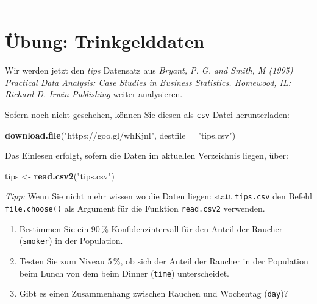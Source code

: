 \documentclass[12pt,ngerman,paper=a4,pagesize,DIV=13]{scrreprt}
\newenvironment{Shaded}{\begin{snugshade}}{\end{snugshade}}
\newcommand{\DataTypeTok}[1]{\textcolor[rgb]{0.13,0.29,0.53}{#1}}
\newcommand{\KeywordTok}[1]{\textcolor[rgb]{0.13,0.29,0.53}{\textbf{#1}}}
\newcommand{\NormalTok}[1]{#1}
\newcommand{\StringTok}[1]{\textcolor[rgb]{0.31,0.60,0.02}{#1}}
\providecommand{\tightlist}{%
  \setlength{\itemsep}{0pt}\setlength{\parskip}{0pt}}
\begin{document}
\begin{center}\rule{0.5\linewidth}{\linethickness}\end{center}

\hypertarget{ubung-trinkgelddaten}{%
\section{Übung: Trinkgelddaten}\label{ubung-trinkgelddaten}}

Wir werden jetzt den \emph{tips} Datensatz aus \emph{Bryant, P. G. and
Smith, M (1995) Practical Data Analysis: Case Studies in Business
Statistics. Homewood, IL: Richard D. Irwin Publishing} weiter
analysieren.

Sofern noch nicht geschehen, können Sie diesen als \texttt{csv} Datei
herunterladen:

\begin{Shaded}
\begin{Highlighting}[]
\KeywordTok{download.file}\NormalTok{(}\StringTok{"https://goo.gl/whKjnl"}\NormalTok{, }\DataTypeTok{destfile =} \StringTok{"tips.csv"}\NormalTok{)}
\end{Highlighting}
\end{Shaded}

Das Einlesen erfolgt, sofern die Daten im aktuellen Verzeichnis liegen,
über:

\begin{Shaded}
\begin{Highlighting}[]
\NormalTok{tips <-}\StringTok{ }\KeywordTok{read.csv2}\NormalTok{(}\StringTok{"tips.csv"}\NormalTok{)}
\end{Highlighting}
\end{Shaded}

\emph{Tipp:} Wenn Sie nicht mehr wissen wo die Daten liegen: statt
\texttt{tips.csv} den Befehl \texttt{file.choose()} als Argument für die
Funktion \texttt{read.csv2} verwenden.

\begin{enumerate}
\def\labelenumi{\arabic{enumi}.}
\tightlist
\item
  Bestimmen Sie ein 90\(\,\)\% Konfidenzintervall für den Anteil der
  Raucher (\texttt{smoker}) in der Population.
\item
  Testen Sie zum Niveau 5\(\,\)\%, ob sich der Anteil der Raucher in der
  Population beim Lunch von dem beim Dinner (\texttt{time})
  unterscheidet.
\item
  Gibt es einen Zusammenhang zwischen Rauchen und Wochentag
  (\texttt{day})?
\end{enumerate}
\end{document}
